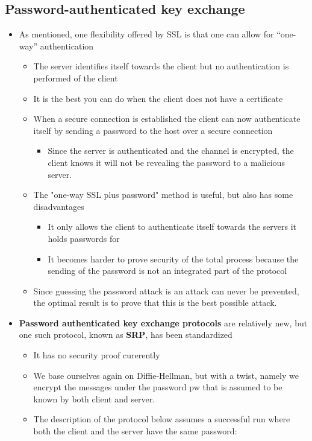 \documentclass[11pt]{article}
\begin{document}
\subsection{Password-authenticated key exchange}
\label{sec:org606e2e5}
\begin{itemize}
\item As mentioned, one flexibility offered by SSL is that one can allow for “one-way” authentication
\begin{itemize}
\item The server identifies itself towards the client but no authentication is performed of the client
\item It is the best you can do when the client does not have a certificate
\item When a secure connection is established the client can now authenticate itself by sending a password to the host over a secure connection
\begin{itemize}
\item Since the server is authenticated and the channel is encrypted, the client knows it will not be revealing the password to a malicious server.
\end{itemize}
\item The "one-way SSL plus password" method is useful, but also has some disadvantages
\begin{itemize}
\item It only allows the client to authenticate itself towards the servers it holds passwords for
\item It becomes harder to prove security of the total process because the sending of the password is not an integrated part of the protocol
\end{itemize}
\item Since guessing the password attack is an attack can never be prevented, the optimal result is to prove that this is the best possible attack.
\end{itemize}

\item \textbf{Password authenticated key exchange protocols} are relatively new, but one such protocol, known as \textbf{SRP}, has been standardized
\begin{itemize}
\item It has no security proof curerently
\item We base ourselves again on Diffie-Hellman, but with a twist, namely we encrypt the messages under the password pw that is assumed to be known by both client and server.
\item The description of the protocol below assumes a successful run where both the client and the server have the same password:
\end{itemize}
\end{itemize}
\end{document}
